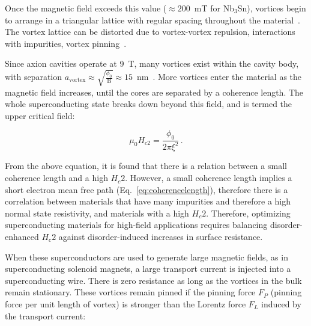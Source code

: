     \noindent Once the magnetic field exceeds this value ($\approx200$~mT for Nb$_3$Sn), vortices begin to arrange in a triangular lattice with regular spacing throughout the material~\cite{traubleFluxLineArrangementSuperconductors1968, abrikosovMagneticPropertiesSuperconducting1957, brandtFluxlineLatticeSuperconductors1995}. The vortex lattice can be distorted due to vortex-vortex repulsion, interactions with impurities, vortex pinning~\cite{campbellPinningFluxVortices1968}.
    
    Since axion cavities operate at 9~T, many vortices exist within the cavity body, with separation $a_\text{vortex} \approx \sqrt{\frac{\phi_0}{\text{B}}} \approx 15$~nm~\cite{blatterVorticesHightemperatureSuperconductors1994}. More vortices enter the material as the magnetic field increases, until the cores are separated by a coherence length. The whole superconducting state breaks down beyond this field, and is termed the upper critical field:


   

     \begin{equation}
        \mu_0 H_{c2} = \frac{\phi_0}{2\pi\xi^2} \,.
        \label{eq:Hc2andCoherence}
    \end{equation}
    
    \noindent From the above equation, it is found that there is a relation between a small coherence length and a high $H_c2$. However, a small coherence length implies a short electron mean free path (Eq.~\ref{eq:coherencelength}), therefore there is a correlation between materials that have many impurities and therefore a high normal state resistivity, and materials with a high $H_c2$. Therefore, optimizing superconducting materials for high-field applications requires balancing disorder-enhanced $H_c2$ against disorder-induced increases in surface resistance.
    
    When these superconductors are used to generate large magnetic fields, as in superconducting solenoid magnets, a large transport current is injected into a superconducting wire. There is zero resistance as long as the vortices in the bulk remain stationary. These vortices remain pinned if the pinning force $F_P$ (pinning force per unit length of vortex) is stronger than the Lorentz force $F_L$ induced by the transport current:

